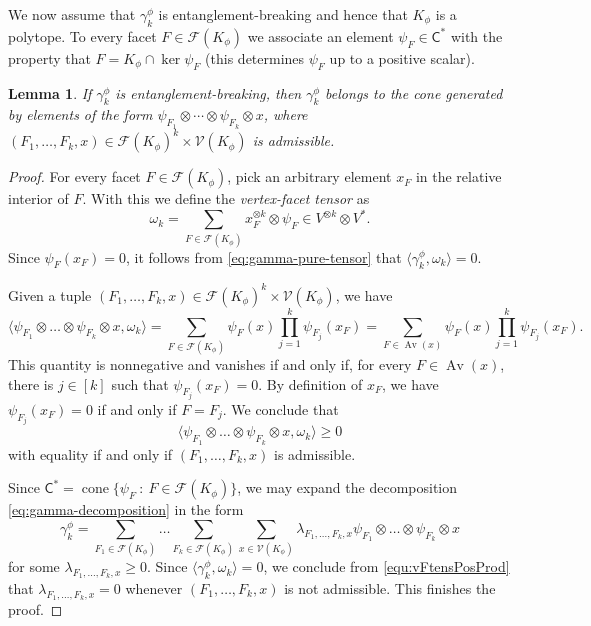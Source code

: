 \documentclass{amsart}
\newcommand{\st}{\ : \ }
\renewcommand{\geq}{\geqslant}
\newcommand{\gC}{\mathsf{C}}
\DeclareMathOperator{\cone}{\mathrm{cone}}
\DeclareMathOperator{\Av}{Av}
\theoremstyle{plain}
\newtheorem{lemma}[theorem]{Lemma}
\begin{document}
We now assume that $\gamma^\phi_k$ is entanglement-breaking and hence that $K_\phi$ is a polytope. To every facet $F \in \mathcal{F}(K_\phi)$ we associate an element $\psi_F \in \gC^*$ with the property that $F = K_\phi \cap \ker \psi_F$ (this determines $\psi_F$ up to a positive scalar).

\begin{lemma} \label{lemma:gamma-vs-admissible}
If $\gamma_k^\phi$ is entanglement-breaking, then $\gamma_k^\phi$ belongs to the cone generated by elements of the form $\psi_{F_1} \otimes \cdots \otimes \psi_{F_k} \otimes x$, where $(F_1, \ldots, F_k,x) \in \mathcal{F}(K_\phi)^k \times \mathcal{V}(K_\phi)$ is admissible.
\end{lemma}
\begin{proof} 
For every facet $F \in \mathcal{F}(K_\phi)$, pick an arbitrary element $x_F$ in the relative interior of $F$. With this we define the \emph{vertex-facet tensor} as
\begin{equation} \label{equ:VFTensor}
\omega_k = \sum_{F \in \mathcal{F}(K_\phi)} x_F^{\otimes k} \otimes \psi_F \in V^{\otimes k}\otimes V^* .
\end{equation}
Since $\psi_F(x_F)=0$, it follows from \eqref{eq:gamma-pure-tensor} that $\langle \gamma_k^\phi , \omega_k \rangle = 0$. 

Given a tuple $(F_1,\dots,F_k,x) \in \mathcal{F}(K_\phi)^k \times \mathcal{V}(K_\phi)$, we have 
\[ \langle \psi_{F_1} \otimes \dots \otimes \psi_{F_k} \otimes x, \omega_k \rangle 
= \sum_{F \in \mathcal{F}(K_\phi)} \psi_F(x) \prod_{j=1}^k \psi_{F_j}(x_F) 
= \sum_{F \in \Av(x)} \psi_F(x) \prod_{j=1}^k \psi_{F_j}(x_F)
.\]
This quantity is nonnegative and vanishes if and only if, for every $F \in \Av(x)$, there is $j \in [k]$ such that $\psi_{F_j}(x_F)=0$. By definition of $x_F$, we have $\psi_{F_j}(x_F)=0$ if and only if $F=F_j$. We conclude that 
\begin{equation}\label{equ:vFtensPosProd} \langle \psi_{F_1} \otimes \dots \otimes \psi_{F_k} \otimes x, \omega_k \rangle \geq 0 \end{equation}
with equality if and only if $(F_1,\dots,F_k,x)$ is admissible. 

Since $\gC^* = \cone \{ \psi_F \st F \in \mathcal{F}(K_\phi) \}$, we may expand the decomposition \eqref{eq:gamma-decomposition} in the form 
\[
\gamma_k^\phi =  \sum_{F_1 \in \mathcal{F}(K_\phi)} \dots
\sum_{F_k \in \mathcal{F}(K_\phi)} \sum_{x \in \mathcal{V}(K_\phi)} \lambda_{F_1,\dots,F_k,x} \psi_{F_1} \otimes \dots \otimes \psi_{F_k} \otimes x
\]
for some $\lambda_{F_1,\dots,F_k,x} \geq 0$. Since $\langle \gamma_k^\phi,\omega_k \rangle =0$, we conclude from \eqref{equ:vFtensPosProd} that $\lambda_{F_1,\dots,F_k,x} = 0$ whenever $(F_1,\dots,F_k,x)$ is not admissible. This finishes the proof.
\end{proof}
\end{document}

